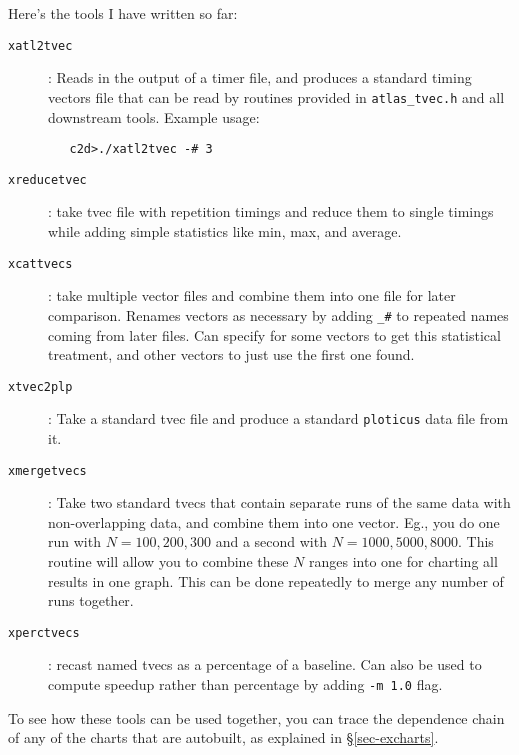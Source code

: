 \documentclass[11pt]{article}
\begin{document}
Here's the tools I have written so far:
\begin{description}
\item [{\tt xatl2tvec}]: Reads in the output of a timer file, and produces
   a standard timing vectors file that can be read by routines provided
   in {\tt atlas\_tvec.h} and all downstream tools.  Example usage:
\begin{verbatim}
   c2d>./xatl2tvec -# 3
\end{verbatim}
\item [{\tt xreducetvec}]: take tvec file with repetition timings and
      reduce them to single timings while adding simple statistics
      like min, max, and average.
\item [{\tt xcattvecs}]: take multiple vector files and combine them into
      one file for later comparison.  Renames vectors as necessary by
      adding \verb+_#+ to repeated names coming from later files.  Can
      specify for some vectors to get this statistical treatment, and
      other vectors to just use the first one found.
\item [{\tt xtvec2plp}]: Take a standard tvec file and produce a standard
      {\tt ploticus} data file from it.
\item [{\tt xmergetvecs}]: Take two standard tvecs that contain separate runs
      of the same data with non-overlapping data, and combine them into
      one vector.  Eg., you do one run with $N=100, 200, 300$ and a second
      with $N=1000, 5000, 8000$.  This routine will allow you to combine 
      these $N$ ranges into one for charting all results in one graph.
      This can be done repeatedly to merge any number of runs together.
\item [{\tt xperctvecs}]: recast named tvecs as a percentage of a baseline.
      Can also be used to compute speedup rather than percentage by adding
      \texttt{-m 1.0} flag.
\end{description}

To see how these tools can be used together, you can trace the dependence
chain of any of the charts that are autobuilt, as explained in
\S\ref{sec-excharts}.
\end{document}
